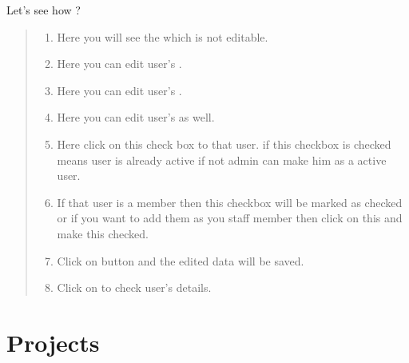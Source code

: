 \documentclass[letterpaper,10pt,english]{sphinxmanual}
\begin{document}
\begin{figure}[htbp]
\centering

\noindent{}
\end{figure}

Let’s see how ?
\begin{quote}
\begin{enumerate}
\item {} 
Here you will see the  which is not editable.

\item {} 
Here you can edit user’s  .

\item {} 
Here you can edit user’s  .

\item {} 
Here you can edit user’s  as well.

\item {} 
Here click on this check box to  that user. if this checkbox is checked means user is already active if not admin can make him as a active user.

\item {} 
If that user is a  member then this checkbox will be marked as checked or if you want to add them as you staff member then click on this and make this checked.

\item {} 
Click on  button and the edited data will be saved.

\end{enumerate}
\begin{enumerate}
\setcounter{enumi}{7}
\item {} 
Click on  to check user’s details.

\end{enumerate}
\end{quote}


\chapter{Projects}
\label{\detokenize{projects::doc}}\label{\detokenize{projects:projects}}
\begin{figure}[htbp]
\centering

\noindent{}
\end{figure}
\end{document}
